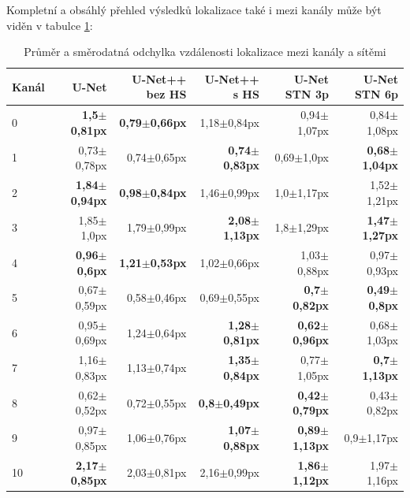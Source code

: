 Kompletní a obsáhlý přehled výsledků lokalizace také i mezi kanály může být viděn v tabulce \ref{tab:mean_std_channels}:

\begin{table}[ht]
    \centering
    \begin{tabular}{lrrrrr}
    \toprule
    Kanál & U-Net & U-Net++ bez HS & U-Net++ s HS & U-Net STN 3p & U-Net STN 6p \\
    \midrule
0 & \textbf{1,5$\pm$0,81px} & \textbf{0,79$\pm$0,66px} & 1,18$\pm$0,84px & 0,94$\pm$1,07px & 0,84$\pm$1,08px \\
1 & 0,73$\pm$0,78px & 0,74$\pm$0,65px & \textbf{0,74$\pm$0,83px} & 0,69$\pm$1,0px & \textbf{0,68$\pm$1,04px} \\
2 & \textbf{1,84$\pm$0,94px} & \textbf{0,98$\pm$0,84px} & 1,46$\pm$0,99px & 1,0$\pm$1,17px & 1,52$\pm$1,21px \\
3 & 1,85$\pm$1,0px & 1,79$\pm$0,99px & \textbf{2,08$\pm$1,13px} & 1,8$\pm$1,29px & \textbf{1,47$\pm$1,27px} \\
4 & \textbf{0,96$\pm$0,6px} & \textbf{1,21$\pm$0,53px} & 1,02$\pm$0,66px & 1,03$\pm$0,88px & 0,97$\pm$0,93px \\
5 & 0,67$\pm$0,59px & 0,58$\pm$0,46px & 0,69$\pm$0,55px & \textbf{0,7$\pm$0,82px} & \textbf{0,49$\pm$0,8px} \\
6 & 0,95$\pm$0,69px & 1,24$\pm$0,64px & \textbf{1,28$\pm$0,81px} & \textbf{0,62$\pm$0,96px} & 0,68$\pm$1,03px \\
7 & 1,16$\pm$0,83px & 1,13$\pm$0,74px & \textbf{1,35$\pm$0,84px} & 0,77$\pm$1,05px & \textbf{0,7$\pm$1,13px} \\
8 & 0,62$\pm$0,52px & 0,72$\pm$0,55px & \textbf{0,8$\pm$0,49px} & \textbf{0,42$\pm$0,79px} & 0,43$\pm$0,82px \\
9 & 0,97$\pm$0,85px & 1,06$\pm$0,76px & \textbf{1,07$\pm$0,88px} & \textbf{0,89$\pm$1,13px} & 0,9$\pm$1,17px \\
10 & \textbf{2,17$\pm$0,85px} & 2,03$\pm$0,81px & 2,16$\pm$0,99px & \textbf{1,86$\pm$1,12px} & 1,97$\pm$1,16px \\
    \bottomrule
    \end{tabular}
    \caption[Průměr a směrodatná odchylka vzdálenosti mezi kanály a sítěmi]{Průměr a směrodatná odchylka vzdálenosti lokalizace mezi kanály a sítěmi}
    \label{tab:mean_std_channels}
\end{table}


\endinput